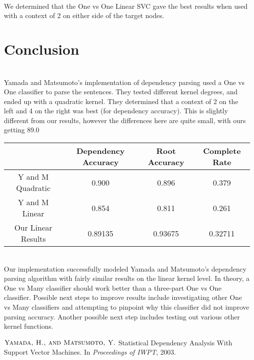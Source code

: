 \documentclass[12pt,fleqn]{amsart}
\begin{document}
\noindent \\
We determined that the One vs One Linear SVC gave the best results when used with a context of 2 on either side of the target nodes. 

\section{Conclusion}

\noindent \\
Yamada and Matsumoto's implementation of dependency parsing used a One vs One classifier to parse the sentences. They tested different kernel degrees, and ended up with a quadratic kernel. They determined that a context of 2 on the left and 4 on the right was best (for dependency accuracy). This is slightly different from our results, however the differences here are quite small, with ours getting 89.0%
 \begin{tabular}{|c|c|c|c|}
            \hline & Dependency Accuracy & Root Accuracy & Complete Rate \\ \hline
            Y and M Quadratic & 0.900 & 0.896 & 0.379 \\ \hline
            Y and M Linear & 0.854 & 0.811 & 0.261 \\ \hline
            Our Linear Results & 0.89135 & 0.93675 & 0.32711 \\ \hline

        \end{tabular}\\

Our implementation successfully modeled Yamada and Matsumoto's dependency parsing algorithm with fairly similar results on the linear kernel level. In theory, a One vs Many classifier should work better than a three-part One vs One classifier. Possible next steps to improve results include investigating other One vs Many classifiers and attempting to pinpoint why this classifier did not improve parsing accuracy. Another possible next step includes testing out various other kernel functions. \\
        
        

\begin{thebibliography}{1}
$\textsc{Yamada, H., and Matsumoto, Y.}$ Statistical Dependency Analysis With Support Vector Machines. In \emph{Proceedings of IWPT}, 2003.
\end{thebibliography}
\end{document}
